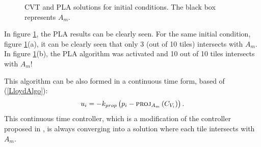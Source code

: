 \documentclass{iacas}
\begin{document}
\begin{figure}
	\captionsetup[subfigure]{position=b}
	\centering
	\caption{CVT and PLA solutions for initial conditions. The black box represents $A_m$.}
\label{fig:projected lloyds algorithm}
\end{figure}

In figure \ref{fig:projected lloyds algorithm}, the PLA results can be clearly seen. For the same initial condition, figure \ref{fig:projected lloyds algorithm}(a), it can be clearly seen that only 3 (out of 10 tiles) intersects with $A_m$. In figure \ref{fig:projected lloyds algorithm}(b), the PLA algorithm was activated and 10 out of 10 tiles intersects with $A_m$!

This algorithm can be also formed in a continuous time form, based of (\ref{LloydAlgo}): %
\begin{equation} \label{ProjectedLloydsContol}
u_{i} = -k_{prop}\left( p_i - \textsc{proj}_{A_m}\left( C_{V_{i}} \right) \right).
\end{equation}
This continuous time controller, which is a modification of the controller proposed in \cite{Cortes2004}, is always converging into a solution where each tile intersects with $A_m$.
\end{document}
